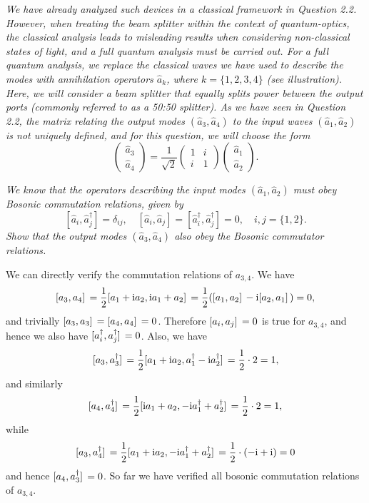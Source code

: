 \documentclass[hyperref, a4paper]{article}
\newcommand*{\ii}{\mathrm{i}}
\begin{document}
\textit{We have already analyzed such devices in a classical framework in Question 2.2. However, when treating the beam splitter within the context of quantum-optics, the classical analysis leads to misleading results when considering non-classical states of light, and a full quantum analysis must be carried out. For a full quantum analysis, we replace the classical waves we have used to describe the modes with annihilation operators $\hat{a}_k$, where $k=\{1,2,3,4\}$ (see illustration).
Here, we will consider a beam splitter that equally splits power between the output ports (commonly referred to as a 50:50 splitter). As we have seen in Question 2.2, the matrix relating the output modes $\left(\hat{a}_3, \hat{a}_4\right)$ to the input waves $\left(\hat{a}_1, \hat{a}_2\right)$ is not uniquely defined, and for this question, we will choose the form}
$$
\left(\begin{array}{l}
\hat{a}_3 \\
\hat{a}_4
\end{array}\right)=\frac{1}{\sqrt{2}}\left(\begin{array}{ll}
1 & i \\
i & 1
\end{array}\right)\left(\begin{array}{l}
\hat{a}_1 \\
\hat{a}_2
\end{array}\right) .
$$

\textit{We know that the operators describing the input modes $\left(\hat{a}_1, \hat{a}_2\right)$ must obey Bosonic commutation relations, given by
$$
\left[\hat{a}_i, \hat{a}_j^{\dagger}\right]=\delta_{i j}, \quad\left[\hat{a}_i, \hat{a}_j\right]=\left[\hat{a}_i^{\dagger}, \hat{a}_j^{\dagger}\right]=0, \quad i, j=\{1,2\} .
$$
Show that the output modes $\left(\hat{a}_3, \hat{a}_4\right)$ also obey the Bosonic commutator relations.}

We can directly verify the commutation relations of $a_{3,4}$.
We have 
\begin{equation}
    \comm*{a_3}{a_4} = \frac{1}{2} \comm*{a_1 + \ii a_2}{\ii a_1 + a_2}
    = \frac{1}{2} (\comm*{a_1}{a_2} - \ii \comm*{a_2}{a_1}) = 0,
\end{equation}
and trivially $\comm*{a_3}{a_3} = \comm*{a_4}{a_4} = 0$.
Therefore $\comm*{a_i}{a_j} = 0$ is true for $a_{3,4}$, 
and hence we also have $\comm*{a_i^\dagger}{a_j^\dagger} = 0$.
Also, we have 
\begin{equation}
    \comm*{a_3}{a_3^\dagger} = \frac{1}{2} \comm*{a_1 + \ii a_2}{a_1^\dagger - \ii a_2^\dagger}
    = \frac{1}{2} \cdot 2 = 1, 
\end{equation}
and similarly 
\begin{equation}
    \comm*{a_4}{a_4^\dagger} = \frac{1}{2} \comm*{\ii a_1 + a_2}{- \ii a_1^\dagger + a_2^\dagger}
    = \frac{1}{2} \cdot 2 = 1,
\end{equation}
while 
\begin{equation}
    \comm*{a_3}{a_4^\dagger} = \frac{1}{2} \comm*{a_1 + \ii a_2}{- \ii a_1^\dagger + a_2^\dagger}
    = \frac{1}{2} \cdot (- \ii + \ii) = 0
\end{equation}
and hence $\comm*{a_4}{a_3^\dagger} = 0$.
So far we have verified all bosonic commutation relations of $a_{3,4}$.
\end{document}
